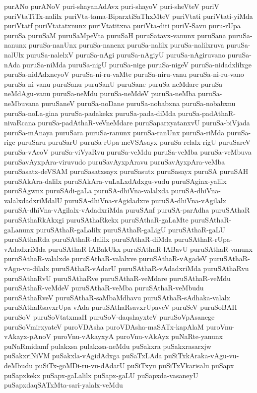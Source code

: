 {purANo
purANoV
puri-shayanAdAvx
puri-shayoV
puri-sheVteV
puriV
puriVtaTiTx-nalilx
puriVta-tama-BiparxtiSaThxMteV
puriVtati
puriVtati-yiMda
puriVtatf
puriVtatatxnunx
puriVtatitxna
puriVta-diti
puriV-Savu
puru-rUpa
puruSa
puruSaM
puruSaMpeVta
puruSaH
puruSatavx-vanunx
puruSana
puruSa-nanunx
puruSa-nanUnx
puruSa-nanenx
puruSa-nalilx
puruSa-nalilxruva
puruSa-nalUlx
puruSa-nalelxV
puruSa-nAgi
puruSa-nAgiyU
puruSa-nAgiruvano
puruSa-nAda
puruSa-niMda
puruSa-nigU
puruSa-nige
puruSa-nigeV
puruSa-nidadxlilxge
puruSa-nidAdxneyoV
puruSa-ni-ru-vaMte
puruSa-niru-vanu
puruSa-ni-ru-vano
puruSa-ni-vanu
puruSanu
puruSanU
puruSane
puruSa-neMdare
puruSa-neMdAgu-vanu
puruSa-neMdu
puruSa-neMdeV
puruSa-neMba
puruSa-neMbuvana
puruSaneV
puruSa-noDane
puruSa-nobabxna
puruSa-nobabxnu
puruSa-noLa-gina
puruSa-padakekx
puruSa-pada-diMda
puruSa-padAthaR-nivaRcana
puruSa-padAthaR-veVneMdare
puruSaparxyatanxvU
puruSa-biVjada
puruSa-mAnaya
puruSara
puruSa-ranunx
puruSa-ranUnx
puruSa-riMda
puruSa-rige
puruSaru
puruSarU
puruSa-rUpa-meVSAsayx
puruSa-relalx-rigU
puruSareV
puruSa-vAcoV
puruSa-viVyaRvu
puruSa-veMdu
puruSa-veMba
puruSa-veMbuva
puruSavAyxpAra-viruvudo
puruSavAyxpAravu
puruSavAyxpAra-veMba
puruSasatx-deVSAM
puruSasatxsayx
puruSasutx
puruSasayx
puruSA
puruSAH
puruSAkAra-dalilx
puruSAkAra-vuLaLxdAdxgu-vudu
puruSAginx-yalilx
puruSAgwnx
puruSAdi-gaLa
puruSA-dhiVna-valalxda
puruSA-dhiVna-valalxdadxriMdalU
puruSA-dhiVna-vAgidadxre
puruSA-dhiVna-vAgilalx
puruSA-dhiVna-vAgilalx-vAdadxriMda
puruSAnf
puruSA-parAdha
puruSAthaR
puruSAthaRkAkxgi
puruSAthaRkekx
puruSAthaR-gaLaMte
puruSAthaR-gaLanunx
puruSAthaR-gaLalilx
puruSAthaR-gaLigU
puruSAthaR-gaLU
puruSAthaRda
puruSAthaR-dalilx
puruSAthaR-diMda
puruSAthaR-rUpa-vAdadxriMda
puruSAthaR-lABakUkx
puruSAthaR-lABavU
puruSAthaR-vanunx
puruSAthaR-valalxde
puruSAthaR-valalxve
puruSAthaR-vAgadeV
puruSAthaR-vAgu-vu-dilalx
puruSAthaR-vAdarU
puruSAthaR-vAdadxriMda
puruSAthaRvu
puruSAthaRvU
puruSAthaRve
puruSAthaR-veMdare
puruSAthaR-veMdu
puruSAthaR-veMdeV
puruSAthaR-veMba
puruSAthaR-veMbudu
puruSAthaRveV
puruSAthaR-saMbaMdhavu
puruSAthaR-sAdhaka-valalx
puruSAthaRsavxrUpa-vAda
puruSAthaRsavxrUpaveV
puruSeV
puruSoBAH
puruSoV
puruSoVtatxmaH
puruSoV-daqshayxteV
puruSoVpAsanege
puruSoVmirxyateV
puroVDAsha
puroVDAsha-maSATx-kapAlaM
puroVnu-vAkayx-pAnoV
puroVnu-vAkayxyA
puroVnu-vAkAyx
puNaRte-yanunx
puNaRmidamf
pulakxsa
pulakxsa-neMdu
puSakxra
puSakxrasarxjw
puSakxriNiVM
puSakxla-vAgidAdxga
puSaTxLAda
puSiTxkAraka-vAgu-vu-deMbudu
puSiTx-goMDi-ru-vu-dAdarU
puSiTxyu
puSiTxVkarisalu
puSapx
puSapxkekx
puSapx-gaLalilx
puSapx-gaLU
puSapxda-vasaneyU
puSapxdaqSATxMta-sari-yalalx-veMdu
}
